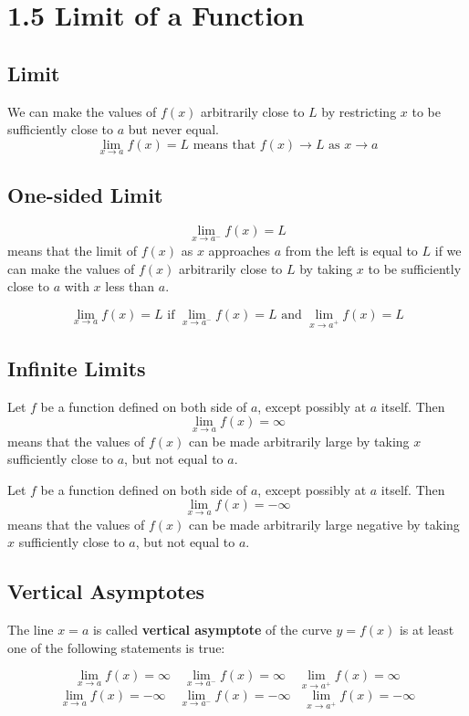 %
%

\section*{1.5 Limit of a Function}

\subsection*{Limit}

We can make the values of \(f(x)\) arbitrarily close to \(L\) by restricting \(x\) to be sufficiently close to \(a\) but never equal.
$$\lim_{x \to a}f(x)=L \text{ means that } f(x) \to L \text{ as } x \to a$$

\subsection*{One-sided Limit}

$$\lim_{x \to a^-}f(x)=L$$
means that the limit of \(f(x)\) as \(x\) approaches \(a\) from the left is equal to \(L\) if we can make the values of \(f(x)\) arbitrarily close to \(L\) by taking \(x\) to be sufficiently close to \(a\) with \(x\) less than \(a\).

$$\lim_{x \to a}f(x)=L \text{ if } \lim_{x \to a^-}f(x)=L \text{ and } \lim_{x \to a^+}f(x)=L$$

\subsection*{Infinite Limits}

Let \(f\) be a function defined on both side of \(a\), except possibly at \(a\) itself. Then 
$$\lim_{x \to a}f(x)=\infty$$
means that the values of \(f(x)\) can be made arbitrarily large by taking \(x\) sufficiently close to \(a\), but not equal to \(a\).

Let \(f\) be a function defined on both side of \(a\), except possibly at \(a\) itself. Then 
$$\lim_{x \to a}f(x)=-\infty$$
means that the values of \(f(x)\) can be made arbitrarily large negative by taking \(x\) sufficiently close to \(a\), but not equal to \(a\).

\subsection*{Vertical Asymptotes}

The line \(x=a\) is called \textbf{vertical asymptote} of the curve \(y=f(x)\) is at least one of the following statements is true:

$$\lim_{x \to a}f(x)=\infty \quad \lim_{x \to a^-}f(x)=\infty \quad \lim_{x \to a^+}f(x)=\infty$$
$$\lim_{x \to a}f(x)=-\infty \quad \lim_{x \to a^-}f(x)=-\infty \quad \lim_{x \to a^+}f(x)=-\infty$$


